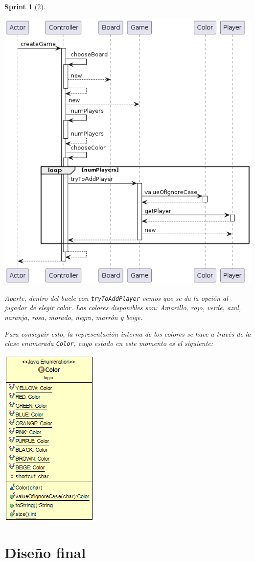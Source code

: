 \documentclass{article}
\theoremstyle{break}
\newtheorem*{sprint}{Sprint}
\begin{document}
\begin{sprint}[2]
\begin{center}
\includegraphics[scale=0.5]{Controller.createGame()-sprint2.png} 
\end{center}

Aparte, dentro del bucle con \texttt{tryToAddPlayer} vemos que se da la opción al jugador de elegir color. Los colores disponibles son: Amarillo, rojo, verde, azul, naranja, rosa, morado, negro, marrón y beige.

Para conseguir esto, la representación interna de los colores se hace a través de la clase enumerada \texttt{Color}, cuyo estado en este momento es el siguiente:

\begin{center}
\includegraphics[scale=0.9]{Color-sprint2.png} 
\end{center}

\end{sprint}

\section{Diseño final}
\end{document}
